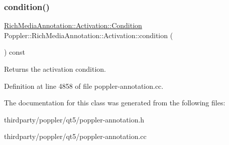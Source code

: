 \subsubsection{\texorpdfstring{condition()}{condition()}}
{\footnotesize\ttfamily \hyperlink{class_poppler_1_1_rich_media_annotation_1_1_activation_a6bd1a04f2b4b84df639ba04ea08b5f85}{Rich\+Media\+Annotation\+::\+Activation\+::\+Condition} Poppler\+::\+Rich\+Media\+Annotation\+::\+Activation\+::condition (\begin{DoxyParamCaption}{ }\end{DoxyParamCaption}) const}

Returns the activation condition. 

Definition at line 4858 of file poppler-\/annotation.\+cc.



The documentation for this class was generated from the following files\+:\begin{DoxyCompactItemize}
\item 
thirdparty/poppler/qt5/poppler-\/annotation.\+h\item 
thirdparty/poppler/qt5/poppler-\/annotation.\+cc\end{DoxyCompactItemize}
